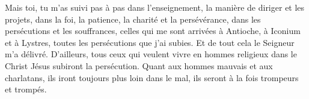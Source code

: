 Mais toi, tu m’as suivi pas à pas dans l’enseignement,
	la manière de diriger et les projets,
	dans la foi, la patience, la charité et la persévérance,
	dans les persécutions et les souffrances,
	celles qui me sont arrivées à Antioche, à Iconium et à Lystres,
	toutes les persécutions que j’ai subies.
Et de tout cela le Seigneur m’a délivré.
D’ailleurs, tous ceux qui veulent vivre en hommes religieux dans le Christ Jésus
	subiront la persécution.
Quant aux hommes mauvais et aux charlatans,
	ils iront toujours plus loin dans le mal, ils seront à la fois trompeurs et trompés.
